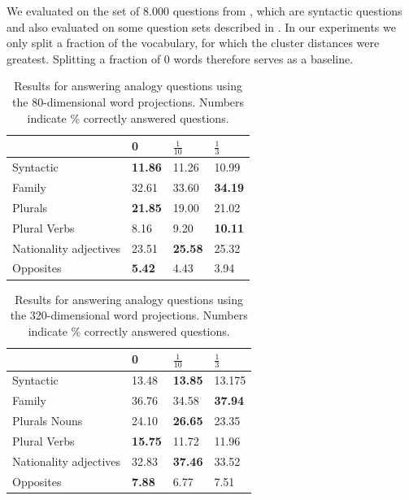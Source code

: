 \documentclass[11pt]{article}
\begin{document}
We evaluated on the set of $8.000$ questions from \cite{Mikolov:13}, which are syntactic questions and also evaluated on some question sets described in \cite{Mikolov:13c}. In our experiments we only split a fraction of the vocabulary, for which the cluster distances were greatest. Splitting a fraction of $0$ words therefore serves as a baseline.
\begin{table}[H]
    \begin{tabular}{|l|l|l|l|}
    \hline
	\backslashbox{Questions}{Split} & 0 & $\frac{1}{10}$ & $\frac{1}{3}$  \\ \hline
	Syntactic  & \textbf{11.86}  & 11.26  & 10.99      \\ \hline
	Family  & 32.61  & 33.60 & \textbf{34.19}     \\ \hline
	Plurals  & \textbf{21.85}  & 19.00 & 21.02     \\ \hline
	Plural Verbs  & 8.16 & 9.20 & \textbf{10.11}     \\ \hline
	Nationality adjectives  & 23.51 & \textbf{25.58} & 25.32     \\ \hline
	Opposites  & \textbf{5.42} & 4.43 & 3.94    \\ \hline

    \end{tabular}
     \caption{Results for answering analogy questions using the 80-dimensional word projections. Numbers indicate \% correctly answered questions.}
    \label{accuracy80}
\end{table}

\begin{table}[H]
    \begin{tabular}{|l|l|l|l|}
    \hline
	\backslashbox{Questions}{Split} & 0 & $\frac{1}{10}$ & $\frac{1}{3}$  \\ \hline
	Syntactic  & 13.48  & \textbf{13.85}  & 13.175      \\ \hline
	Family  & 36.76  & 34.58 & \textbf{37.94}     \\ \hline
	Plurals Nouns & 24.10  & \textbf{26.65} & 23.35     \\ \hline
	Plural Verbs  & \textbf{15.75} & 11.72 & 11.96     \\ \hline
	Nationality adjectives  & 32.83 & \textbf{37.46} & 33.52     \\ \hline
	Opposites  & \textbf{7.88} & 6.77 & 7.51    \\ \hline

    \end{tabular}
     \caption{Results for answering analogy questions using the 320-dimensional word projections. Numbers indicate \% correctly answered questions.}
    \label{accuracy320}
\end{table}
\end{document}
